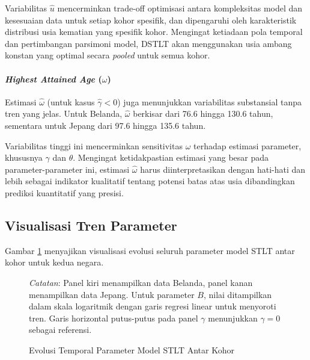 Variabilitas $\hat{u}$ mencerminkan trade-off optimisasi antara kompleksitas model dan kesesuaian data untuk setiap kohor spesifik, dan dipengaruhi oleh karakteristik distribusi usia kematian yang spesifik kohor. Mengingat ketiadaan pola temporal dan pertimbangan parsimoni model, DSTLT akan menggunakan usia ambang konstan yang optimal secara \textit{pooled} untuk semua kohor.

\paragraph{\textit{Highest Attained Age} ($\omega$)}
Estimasi $\hat{\omega}$ (untuk kasus $\hat{\gamma} < 0$) juga menunjukkan variabilitas substansial tanpa tren yang jelas. Untuk Belanda, $\hat{\omega}$ berkisar dari 76.6 hingga 130.6 tahun, sementara untuk Jepang dari 97.6 hingga 135.6 tahun.

Variabilitas tinggi ini mencerminkan sensitivitas $\omega$ terhadap estimasi parameter, khususnya $\gamma$ dan $\theta$. Mengingat ketidakpastian estimasi yang besar pada parameter-parameter ini, estimasi $\hat{\omega}$ harus diinterpretasikan dengan hati-hati dan lebih sebagai indikator kualitatif tentang potensi batas atas usia dibandingkan prediksi kuantitatif yang presisi.

\subsection{Visualisasi Tren Parameter}

Gambar \ref{fig:parameter_evolution} menyajikan visualisasi evolusi seluruh parameter model STLT antar kohor untuk kedua negara.

\begin{figure}[htbp]
\centering
\caption{Evolusi Temporal Parameter Model STLT Antar Kohor}
\label{fig:parameter_evolution}
\begin{fignotes}
\small
\item \textit{Catatan}: Panel kiri menampilkan data Belanda, panel kanan menampilkan data Jepang. Untuk parameter $B$, nilai ditampilkan dalam skala logaritmik dengan garis regresi linear untuk menyoroti tren. Garis horizontal putus-putus pada panel $\gamma$ menunjukkan $\gamma = 0$ sebagai referensi.
\end{fignotes}
\end{figure}

